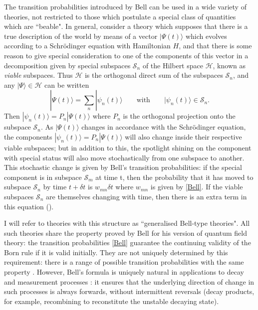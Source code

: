\documentclass[12pt,reqno]{article}
\renewcommand{\(}{\left(}
\renewcommand{\)}{\right)}
\renewcommand{\.}{\centerdot}
\renewcommand{\S}{\mathcal{S}}
\renewcommand{\H}{\mathcal{H}}
\newcommand{\1}{\mathbf{1}}
\newcommand{\<}{\langle}
\renewcommand{\>}{\rangle}
\theoremstyle{definition}
\theoremstyle{remark}
\numberwithin{equation}{section}
\begin{document}
The transition probabilities introduced by Bell can be used in a wide variety of theories, not restricted to those which postulate a special class of quantities which are ``beable". In general, consider a theory which supposes that there is a true description of the world by means of a vector $|\Psi(t)\>$ which evolves according to a Schr\"odinger equation with Hamiltonian $H$, and that there is some reason to give special consideration to one of the components of this vector in a decomposition given by special subspaces $\S_n$ of the Hilbert space $\H$, known as \emph{viable} subspaces. Thus $\H$ is the orthogonal direct sum of the subspaces $\S_n$, and any $|\Psi\> \in \H$ can be written
\[
|\Psi(t)\> = \sum_n|\psi_n(t)\> \qquad \text{with} \qquad |\psi_n(t)\>\in\S_n.
\]
Then $|\psi_n(t)\> = P_n|\Psi(t)\>$ where $P_n$ is the orthogonal projection onto the subspace $\S_n$. As $|\Psi(t)\>$ changes in accordance with the Schr\"odinger equation, the components $|\psi_n(t)\> = P_n|\Psi(t)\>$ will also change inside their respective viable subspaces; but in addition to this, the spotlight shining on the component with special status will also move stochastically from one subspace to another. This stochastic change is given by Bell's transition probabilities: if the special component is in subspace $\S_m$ at time t, then the probability that it has moved to subspace $\S_n$ by time $t + \delta t$ is $w_{mn}\delta t$ where $w_{mn}$ is given by \eqref{Bell}. If the viable subspaces $\S_n$ are themselves changing with time, then there is an extra term in this equation (\cite{BacciaDickson, verdammte}).

I will refer to theories with this structure as ``generalised Bell-type theories". All such theories share the property proved by Bell for his version of quantum field theory: the transition probabilities \eqref{Bell} guarantee the continuing validity of the Born rule if it is valid initially. They are not uniquely determined by this requirement: there is a range of possible transition probabilities with the same property \cite{BacciaDickson}. However, Bell's formula is uniquely natural in applications to decay \cite{verdammte} and measurement processes \cite{singleworld, Hollowood:classical}: it ensures that the underlying direction of change in such processes is always forwards, without intermittent reversals (decay products, for example, recombining to reconstitute the unstable decaying state).
\end{document}
